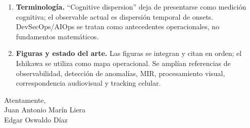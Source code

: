 \documentclass[11pt]{article}
\begin{document}
\begin{enumerate}[leftmargin=*]
\item \textbf{Terminología.} ``Cognitive dispersion'' deja de presentarse como medición cognitiva; el observable actual es dispersión temporal de onsets. DevSecOps/AIOps se tratan como antecedentes operacionales, no fundamentos matemáticos.
\item \textbf{Figuras y estado del arte.} Las figuras se integran y citan en orden; el Ishikawa se utiliza como mapa operacional. Se amplían referencias de observabilidad, detección de anomalías, MIR, procesamiento visual, correspondencia audiovisual y tracking celular.
\end{enumerate}
\noindent Atentamente,\\[3mm]
Juan Antonio Marín Liera\\
Edgar Oswaldo Díaz
\end{document}
